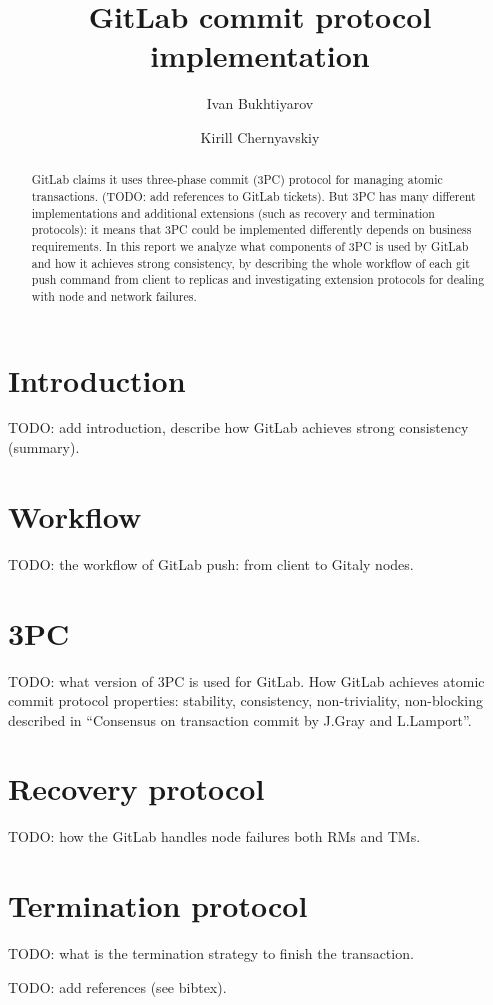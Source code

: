 \documentclass[acmlarge, screen, nonacm]{acmart}
\title{GitLab commit protocol implementation}
\author{Ivan Bukhtiyarov}
\author{Kirill Chernyavskiy}
\begin{document}
\begin{abstract}
  GitLab claims it uses three-phase commit (3PC) protocol for managing atomic transactions.
  (TODO: add references to GitLab tickets). But 3PC has many different implementations and
  additional extensions (such as recovery and termination protocols): it means that 3PC could
  be implemented differently depends on business requirements. In this report we analyze what
  components of 3PC is used by GitLab and how it achieves strong consistency, by describing
  the whole workflow of each git push command from client to replicas and investigating
  extension protocols for dealing with node and network failures.
\end{abstract}

\maketitle

\section{Introduction}

TODO: add introduction, describe how GitLab achieves strong consistency (summary).

\section{Workflow}

TODO: the workflow of GitLab push: from client to Gitaly nodes.

\section{3PC}

TODO: what version of 3PC is used for GitLab. How GitLab achieves atomic commit protocol properties:
stability, consistency, non-triviality, non-blocking described in
``Consensus on transaction commit by J.Gray and L.Lamport''.

\section{Recovery protocol}

TODO: how the GitLab handles node failures both RMs and TMs.

\section{Termination protocol}

TODO: what is the termination strategy to finish the transaction.


TODO: add references (see bibtex).
\end{document}
